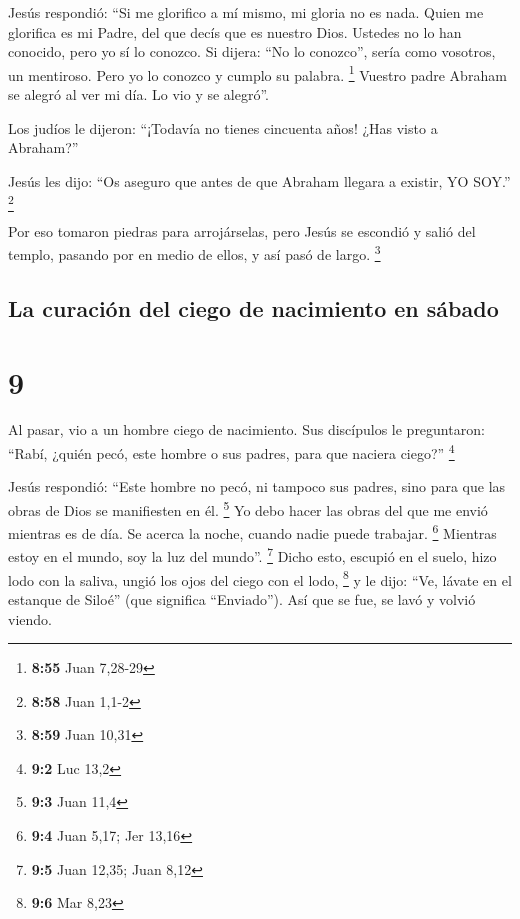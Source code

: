  Jesús respondió: ``Si me glorifico a mí mismo, mi gloria
no es nada. Quien me glorifica es mi Padre, del que decís que es nuestro
Dios.  Ustedes no lo han conocido, pero yo sí lo conozco.
Si dijera: ``No lo conozco'', sería como vosotros, un mentiroso. Pero yo
lo conozco y cumplo su palabra. \footnote{\textbf{8:55} Juan 7,28-29}
 Vuestro padre Abraham se alegró al ver mi día. Lo vio y
se alegró''.

 Los judíos le dijeron: ``¡Todavía no tienes cincuenta
años! ¿Has visto a Abraham?''

 Jesús les dijo: ``Os aseguro que antes de que Abraham
llegara a existir, YO SOY.'' \footnote{\textbf{8:58} Juan 1,1-2}

 Por eso tomaron piedras para arrojárselas, pero Jesús se
escondió y salió del templo, pasando por en medio de ellos, y así pasó
de largo. \footnote{\textbf{8:59} Juan 10,31}

\hypertarget{la-curaciuxf3n-del-ciego-de-nacimiento-en-suxe1bado}{%
\subsection{La curación del ciego de nacimiento en
sábado}\label{la-curaciuxf3n-del-ciego-de-nacimiento-en-suxe1bado}}

\hypertarget{section-8}{%
\section{9}\label{section-8}}

 Al pasar, vio a un hombre ciego de nacimiento.
 Sus discípulos le preguntaron: ``Rabí, ¿quién pecó, este
hombre o sus padres, para que naciera ciego?'' \footnote{\textbf{9:2}
  Luc 13,2}

 Jesús respondió: ``Este hombre no pecó, ni tampoco sus
padres, sino para que las obras de Dios se manifiesten en él.
\footnote{\textbf{9:3} Juan 11,4}  Yo debo hacer las obras
del que me envió mientras es de día. Se acerca la noche, cuando nadie
puede trabajar. \footnote{\textbf{9:4} Juan 5,17; Jer 13,16}
 Mientras estoy en el mundo, soy la luz del mundo''.
\footnote{\textbf{9:5} Juan 12,35; Juan 8,12}  Dicho esto,
escupió en el suelo, hizo lodo con la saliva, ungió los ojos del ciego
con el lodo, \footnote{\textbf{9:6} Mar 8,23}  y le dijo:
``Ve, lávate en el estanque de Siloé'' (que significa ``Enviado''). Así
que se fue, se lavó y volvió viendo.

